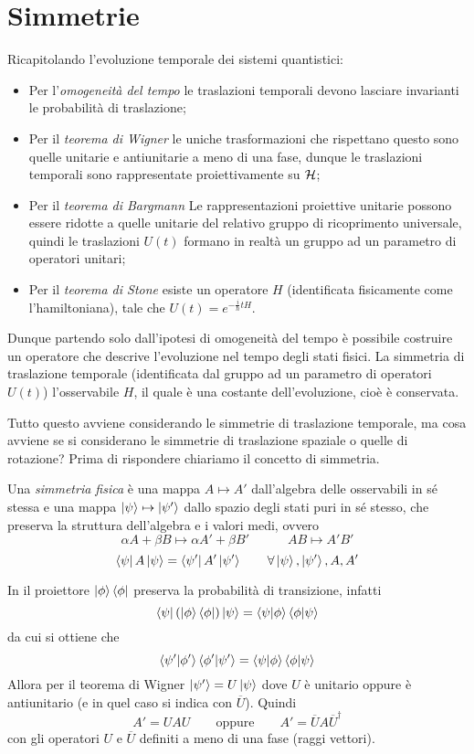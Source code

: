 \documentclass[../../FisicaTeorica.tex]{subfiles}
\begin{document}
\section{Simmetrie}
Ricapitolando l'evoluzione temporale dei sistemi quantistici:
\begin{itemize}
\item Per l'\emph{omogeneità del tempo} le traslazioni temporali devono lasciare invarianti le probabilità di traslazione;
\item Per il \emph{teorema di Wigner} le uniche trasformazioni che rispettano questo sono quelle unitarie e antiunitarie a meno di una fase, dunque le traslazioni temporali sono rappresentate proiettivamente su $\mathcal{H}$;
\item Per il \emph{teorema di Bargmann} Le rappresentazioni proiettive unitarie possono essere ridotte a quelle unitarie del relativo gruppo di ricoprimento universale, quindi le traslazioni $U(t)$ formano in realtà un gruppo ad un parametro di operatori unitari;
\item Per il \emph{teorema di Stone} esiste un operatore $H$ (identificata fisicamente come l'hamiltoniana), tale che $U(t) = e^{-\frac{i}{\hbar} t H}$.
\end{itemize}

Dunque partendo solo dall'ipotesi di omogeneità del tempo è possibile costruire un operatore che descrive l'evoluzione nel tempo degli stati fisici. La simmetria di traslazione temporale (identificata dal gruppo ad un parametro di operatori $U(t)$)  l'osservabile $H$, il quale è una costante dell'evoluzione, cioè è conservata.

Tutto questo avviene considerando le simmetrie di traslazione temporale, ma cosa avviene se si considerano le simmetrie di traslazione spaziale o quelle di rotazione? Prima di rispondere chiariamo il concetto di simmetria.

\begin{dfn}
Una \emph{simmetria fisica} è una mappa $A \mapsto A'$ dall'algebra delle osservabili in sé stessa e una mappa $\ket{\psi} \mapsto \ket{\psi'}$ dallo spazio degli stati puri in sé stesso, che preserva la struttura dell'algebra e i valori medi, ovvero
\[
\alpha A + \beta B \mapsto \alpha A' + \beta B' \quad \quad \quad A B \mapsto A' B'
\]
\[
\bra\psi A \ket\psi = \bra{\psi'} A' \ket{\psi'} \qquad \forall \ket\psi, \ket{\psi'}, A, A'
\]
\end{dfn}

In \MQ il proiettore $\ket\phi \bra\phi$ preserva la probabilità di transizione, infatti
\[
\bra\psi (\ket\phi \bra\phi) \ket\psi = \braket{\psi|\phi} \braket{\phi|\psi}
\]
da cui si ottiene che
\[
\braket{\psi'|\phi'} \braket{\phi'|\psi'} = \braket{\psi|\phi} \braket{\phi|\psi}
\]
Allora per il teorema di Wigner $\ket{\psi'} = U \ket\psi$ dove $U$ è unitario oppure è antiunitario (e in quel caso si indica con $\overline U$). Quindi
\[
A' = U A U \qquad \text{oppure} \qquad A' = \overline U A \overline U^\dag
\]
con gli operatori $U$ e $\overline U$ definiti a meno di una fase (raggi vettori).
\end{document}
